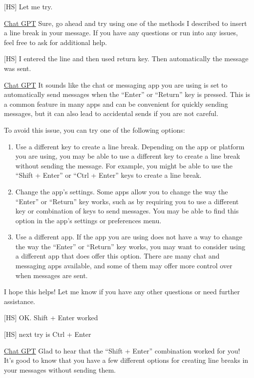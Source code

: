 \documentclass[
]{bxjsbook}
\providecommand{\tightlist}{%
  \setlength{\itemsep}{0pt}\setlength{\parskip}{0pt}}
\theoremstyle{definition}
\theoremstyle{definition}
\theoremstyle{definition}
\theoremstyle{definition}
\theoremstyle{remark}
\begin{document}
{[}HS{]} Let me try.

\protect\hyperlink{chatgpt}{Chat GPT} Sure, go ahead and try using one of the methods I described to insert a line break in your message. If you have any questions or run into any issues, feel free to ask for additional help.

{[}HS{]} I entered the line and then used return key. Then automatically the message was sent.

\protect\hyperlink{chatgpt}{Chat GPT} It sounds like the chat or messaging app you are using is set to automatically send messages when the ``Enter'' or ``Return'' key is pressed. This is a common feature in many apps and can be convenient for quickly sending messages, but it can also lead to accidental sends if you are not careful.

To avoid this issue, you can try one of the following options:

\begin{enumerate}
\def\labelenumi{\arabic{enumi}.}
\tightlist
\item
  Use a different key to create a line break. Depending on the app or platform you are using, you may be able to use a different key to create a line break without sending the message. For example, you might be able to use the ``Shift + Enter'' or ``Ctrl + Enter'' keys to create a line break.
\item
  Change the app's settings. Some apps allow you to change the way the ``Enter'' or ``Return'' key works, such as by requiring you to use a different key or combination of keys to send messages. You may be able to find this option in the app's settings or preferences menu.
\item
  Use a different app. If the app you are using does not have a way to change the way the ``Enter'' or ``Return'' key works, you may want to consider using a different app that does offer this option. There are many chat and messaging apps available, and some of them may offer more control over when messages are sent.
\end{enumerate}

I hope this helps! Let me know if you have any other questions or need further assistance.

{[}HS{]} OK. Shift + Enter worked

{[}HS{]} next try is Ctrl + Enter

\protect\hyperlink{chatgpt}{Chat GPT} Glad to hear that the ``Shift + Enter'' combination worked for you! It's good to know that you have a few different options for creating line breaks in your messages without sending them.
\end{document}
